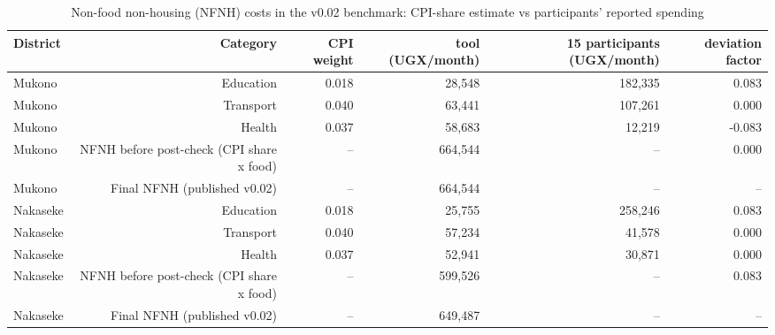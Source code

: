 \begin{table}[htbp]
\centering
\caption{Non-food non-housing (NFNH) costs in the v0.02 benchmark: CPI-share estimate vs participants' reported spending}
\label{tab:nfnh_postcheck}
\begin{tabular}{lrrrrr}
\toprule
District & Category & CPI weight & tool (UGX/month) & 15 participants (UGX/month) & deviation factor \\
\midrule
Mukono & Education & 0.018 & 28,548 & 182,335 & 0.083 \\
Mukono & Transport & 0.040 & 63,441 & 107,261 & 0.000 \\
Mukono & Health & 0.037 & 58,683 & 12,219 & -0.083 \\
Mukono & NFNH before post-check (CPI share x food) & -- & 664,544 & -- & 0.000 \\
Mukono & Final NFNH (published v0.02) & -- & 664,544 & -- & -- \\
Nakaseke & Education & 0.018 & 25,755 & 258,246 & 0.083 \\
Nakaseke & Transport & 0.040 & 57,234 & 41,578 & 0.000 \\
Nakaseke & Health & 0.037 & 52,941 & 30,871 & 0.000 \\
Nakaseke & NFNH before post-check (CPI share x food) & -- & 599,526 & -- & 0.083 \\
Nakaseke & Final NFNH (published v0.02) & -- & 649,487 & -- & -- \\
\bottomrule
\end{tabular}
\end{table}

